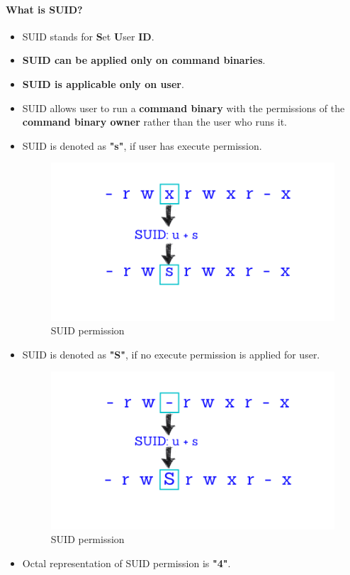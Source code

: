 \setlength{\columnsep}{3pt}
\begin{flushleft}
	\paragraph{What is SUID?}
	\begin{itemize}
		\item SUID stands for \textbf{S}et \textbf{U}ser \textbf{ID}.
		\item \textbf{SUID can be applied only on command binaries}.
		\item \textbf{SUID is applicable only on user}.
		\item SUID allows user to run a \textbf{command binary} with the permissions of the \textbf{command binary owner} rather than the user who runs it.
		\item SUID is denoted as \textbf{"s"}, if user has execute permission.
		\begin{figure}[h!]
			\centering
			\includegraphics[scale=0.3]{content/chapter6/images/adv_perm1.png}
			\caption{SUID permission}
			\label{fig:combination_permission3}
		\end{figure}
		\item SUID is denoted as \textbf{"S"}, if no execute permission is applied for user.
		\begin{figure}[h!]
			\centering
			\includegraphics[scale=0.3]{content/chapter6/images/adv_perm2.png}
			\caption{SUID permission}
			\label{fig:combination_permission4}
		\end{figure}
		\item Octal representation of SUID permission is \textbf{"4"}.
	\end{itemize}
	\newpage

\end{flushleft}
